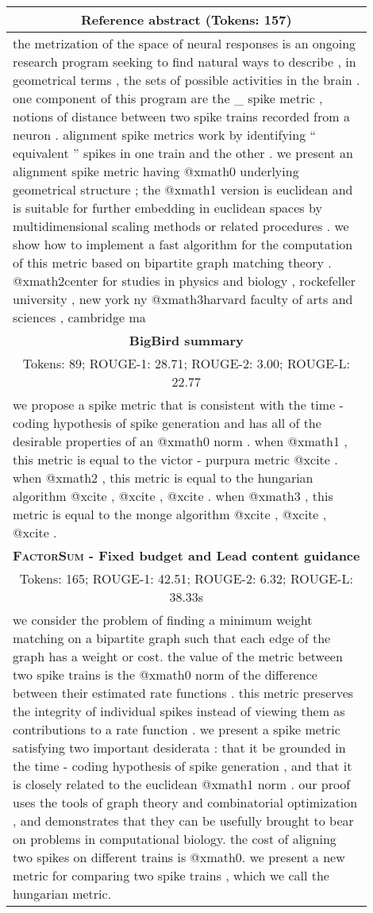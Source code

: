 \documentclass[11pt,table]{article}
\newcommand{\modelname}{FactorSum}
\begin{document}
\begin{table*}[ht]
  \centering
  \begin{tabular}{p{0.9\linewidth}}
    \toprule
    \multicolumn{1}{c}{\textbf{Reference abstract} (Tokens: 157)} \\
    \midrule
    the metrization of the space of neural responses is an ongoing research program seeking to find natural ways to describe , in geometrical terms , the sets of possible activities in the brain . one component of this program are the \_ spike metric , notions of distance between two spike trains recorded from a neuron . alignment spike metrics work by identifying `` equivalent '' spikes in one train and the other . we present an alignment spike metric having @xmath0 underlying geometrical structure ; the @xmath1 version is euclidean and is suitable for further embedding in euclidean spaces by multidimensional scaling methods or related procedures . we show how to implement a fast algorithm for the computation of this metric based on bipartite graph matching theory . @xmath2center for studies in physics and biology , rockefeller university , new york ny @xmath3harvard faculty of arts and sciences , cambridge ma\\
    \midrule
    \multicolumn{1}{c}{\textbf{BigBird summary}} \\
    \multicolumn{1}{c}{Tokens: 89; ROUGE-1: 28.71; ROUGE-2: 3.00; ROUGE-L: 22.77} \\
    \midrule
    we propose a spike metric that is consistent with the time - coding hypothesis of spike generation and has all of the desirable properties of an @xmath0 norm . when @xmath1 , this metric is equal to the victor - purpura metric @xcite . when @xmath2 , this metric is equal to the hungarian algorithm @xcite , @xcite , @xcite . when @xmath3 , this metric is equal to the monge algorithm @xcite , @xcite , @xcite .\\
    \midrule
    \multicolumn{1}{c}{\textbf{\textsc{\modelname} - Fixed budget and Lead content guidance}} \\
    \multicolumn{1}{c}{Tokens: 165; ROUGE-1: 42.51; ROUGE-2: 6.32; ROUGE-L: 38.33s} \\
    \midrule
    we consider the problem of finding a minimum weight matching on a bipartite graph such that each edge of the graph has a weight or cost. the value of the metric between two spike trains is the @xmath0 norm of the difference between their estimated rate functions . this metric preserves the integrity of individual spikes instead of viewing them as contributions to a rate function . we present a spike metric satisfying two important desiderata : that it be grounded in the time - coding hypothesis of spike generation , and that it is closely related to the euclidean @xmath1 norm . our proof uses the tools of graph theory and combinatorial optimization , and demonstrates that they can be usefully brought to bear on problems in computational biology. the cost of aligning two spikes on different trains is @xmath0. we present a new metric for comparing two spike trains , which we call the hungarian metric.\\

\end{tabular}
\end{table*}
\end{document}
